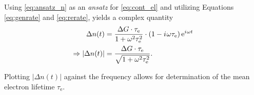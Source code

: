 Using \autoref{eq:ansatz_n} as an \textit{ansatz} for \autoref{eq:cont_el} and utilizing Equations \ref{eq:genrate} and \ref{eq:rerate}, yields a complex quantity
\begin{align}
	\Delta n(t) &= \frac{\Delta G\cdot\tau_\text{e}}{1+\omega^2\tau_\text{e}^2}\cdot\left(1 -{i\mkern1mu}\omega\tau_\text{e}\right)\mathrm{e}^{{i\mkern1mu}\omega t} \nonumber \\
	\Rightarrow |\Delta n(t)| &= \frac{\Delta G\cdot\tau_\text{e}}{\sqrt{1+\omega^2\tau_\text{e}^2}}.\label{eq:freq-dependence}
\end{align}

Plotting $|\Delta n(t)|$ against the frequency allows for determination of the mean electron lifetime $\tau_\text{e}$.
